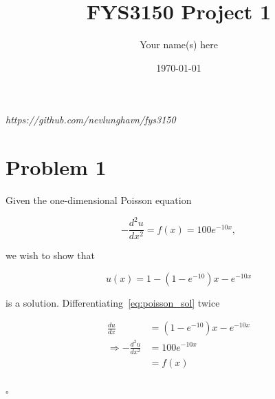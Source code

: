 \documentclass[english,notitlepage]{revtex4-1}  %
\begin{document}
\title{FYS3150 Project 1}      %
\author{Your name(s) here}          %
\date{\today}                             %
\noaffiliation                            %


\maketitle 
    
\textit{https://github.com/nevlunghavn/fys3150}
    
\section*{Problem 1}
Given the one-dimensional Poisson equation

\begin{equation}\label{eq:poisson}
    -\frac{d^2u}{dx^2} = f(x) = 100e^{-10x},
\end{equation}

we wish to show that 

\begin{equation}\label{eq:poisson_sol}
    u(x) = 1 - (1 - e^{-10}) x - e^{-10x}
\end{equation}

is a solution. Differentiating~\ref{eq:poisson_sol} twice
 
\begin{align*}
    \frac{du}{dx} &= (1 - e^{-10}) x - e^{-10x}\\
    \Rightarrow -\frac{d^2u}{dx^2} &= 100 e^{-10x}\\
    &= f(x)\\
\end{align*}

\hfill $\square$\\
\end{document}
